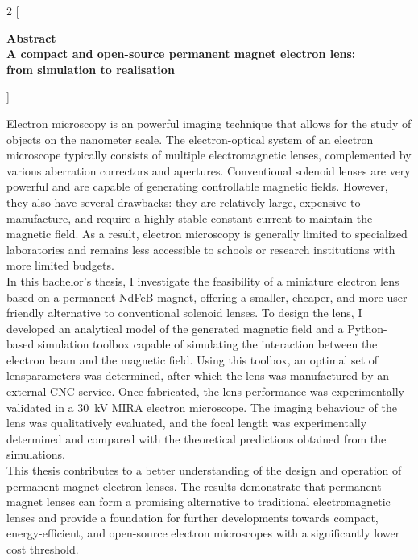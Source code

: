 \documentclass[we,twoside,openright,a4paper,11pt]{uantwerpenbamathesis}
\begin{document}
\clearpage
\thispagestyle{empty}


\makeatletter
\begin{multicols}{2}
[
\begin{center}
\textbf{
  \Large Abstract\\[1ex]
  \Large A compact and open-source permanent magnet electron lens:\\
  from simulation to realisation\\[1ex]
  \large \@author
}
\end{center}
]

Electron microscopy is an powerful imaging technique that allows for the study of objects on the nanometer scale. The electron-optical system of an electron microscope typically consists of multiple electromagnetic lenses, complemented by various aberration correctors and apertures. Conventional solenoid lenses are very powerful and are capable of generating controllable magnetic fields. However, they also have several drawbacks: they are relatively large, expensive to manufacture, and require a highly stable constant current to maintain the magnetic field. As a result, electron microscopy is generally limited to specialized laboratories and remains less accessible to schools or research institutions with more limited budgets.\\

In this bachelor’s thesis, I investigate the feasibility of a miniature electron lens based on a permanent NdFeB magnet, offering a smaller, cheaper, and more user-friendly alternative to conventional solenoid lenses. To design the lens, I developed an analytical model of the generated magnetic field and a Python-based simulation toolbox capable of simulating the interaction between the electron beam and the magnetic field. Using this toolbox, an optimal set of lensparameters was determined, after which the lens was manufactured by an external CNC service. Once fabricated, the lens performance was experimentally validated in a $30$~kV MIRA electron microscope. The imaging behaviour of the lens was qualitatively evaluated, and the focal length was experimentally determined and compared with the theoretical predictions obtained from the simulations.\\

This thesis contributes to a better understanding of the design and operation of permanent magnet electron lenses. The results demonstrate that permanent magnet lenses can form a promising alternative to traditional electromagnetic lenses and provide a foundation for further developments towards compact, energy-efficient, and open-source electron microscopes with a significantly lower cost threshold.

\end{multicols}
\makeatother
\end{document}
